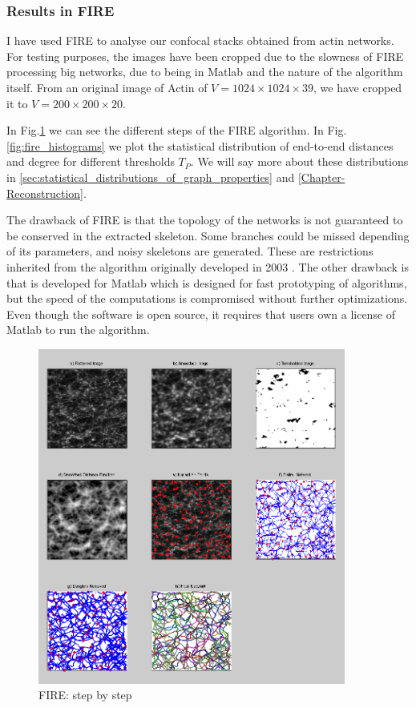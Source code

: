 \subsubsection{Results in FIRE}
 I have used FIRE to analyse our
 confocal stacks obtained from actin networks. For testing purposes, the images
have been cropped due to the slowness of FIRE
processing big networks, due to being in Matlab and the nature of the algorithm itself.
From an original image of Actin of
$V=1024\times1024\times39$, we have cropped it to $V=200\times200\times20$.

In Fig.\ref{fig:fire_stepbystep} we can see the different steps of the FIRE
algorithm. In Fig.\ref{fig:fire_histograms} we plot the statistical distribution
of end-to-end distances and degree for different thresholds $T_P$. We
will say more about these distributions in \autoref{sec:statistical_distributions_of_graph_properties} and \autoref{Chapter-Reconstruction}.

The drawback of FIRE is that the topology of the networks is not guaranteed to be conserved in the extracted skeleton. Some branches could be missed depending of its parameters,
and noisy skeletons are generated. These are restrictions inherited from the algorithm originally developed in 2003 \cite{wu_automated_2003}.
The other drawback is that is developed for Matlab which is designed for fast prototyping of algorithms, but the speed of the computations is compromised without further optimizations. Even though the software is open source, it requires that users own a license of Matlab to run the algorithm.

\begin{figure}[H]
  \centering
  \includegraphics[width=0.9\textwidth]{Figures/chapter-image/fire/fire012.png}%
  \caption[Fire: Step by step for $T_P=0.12$]{FIRE: step by step}
  \label{fig:fire_stepbystep}
\end{figure}

